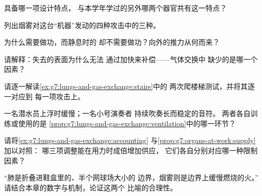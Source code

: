 \begin{exercise}[$\star$]\label{exo:g7:lungs-and-gas-exchange:5}
具备哪一项设计特点，
与本学年学过的另外哪两个器官共有这一特点？
\end{exercise}

\begin{exercise}[$\star$]\label{exo:g7:lungs-and-gas-exchange:6}
列出烟雾对这台“机器”发动的四种攻击中的三种。
\end{exercise}

\begin{exercise}[$\star\star$]\label{exo:g7:lungs-and-gas-exchange:7}
为什么需要做功，而静息时的
却不需要做功？向外的推力从何而来？
\end{exercise}

\begin{exercise}[$\star\star$]\label{exo:g7:lungs-and-gas-exchange:8}
请解释：失去的表面为什么无法
通过加快来补偿——气体交换中
缺少的是哪一个因素？
\end{exercise}

\begin{exercise}[$\star\star$]\label{exo:g7:lungs-and-gas-exchange:9}
请逐一解读\cref{ex:g7:lungs-and-gas-exchange:stairs}中的
两次爬楼梯测试，并将其逐一对应到
每一项攻击上。
\end{exercise}

\begin{exercise}[$\star\star$]\label{exo:g7:lungs-and-gas-exchange:10}
一名潜水员上浮时缓慢；一名小号演奏者
持续吹奏长而稳定的音符。
两者各自训练或使用的是
\cref{prop:g7:lungs-and-gas-exchange:ventilation}中的哪一环节？
\end{exercise}

\begin{exercise}[$\star\star$]\label{exo:g7:lungs-and-gas-exchange:11}
请将\cref{ex:g7:lungs-and-gas-exchange:accounting}
与\cref{prop:g7:organs-at-work:supply}加以对照：
哪三项调整能在用力时成倍增加供应，
它们各自分别对应哪一种限制因素？
\end{exercise}

\begin{exercise}[$\star\star\star$]\label{exo:g7:lungs-and-gas-exchange:12}
“肺是折叠进鞋盒里的、半个网球场大小的
边界，烟雾则是边界上缓慢燃烧的火。”
请结合本章的数字与机制，论证这两个
比喻的合理性。
\end{exercise}

